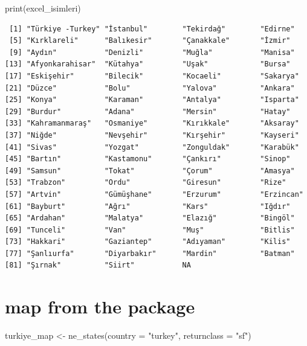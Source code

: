 \documentclass[
  11pt,
  a4paper,
  DIV=11,
  numbers=noendperiod]{scrartcl}
\newenvironment{Shaded}{\begin{snugshade}}{\end{snugshade}}
\newcommand{\AttributeTok}[1]{\textcolor[rgb]{0.40,0.45,0.13}{#1}}
\newcommand{\FunctionTok}[1]{\textcolor[rgb]{0.28,0.35,0.67}{#1}}
\newcommand{\NormalTok}[1]{\textcolor[rgb]{0.00,0.23,0.31}{#1}}
\newcommand{\OtherTok}[1]{\textcolor[rgb]{0.00,0.23,0.31}{#1}}
\newcommand{\StringTok}[1]{\textcolor[rgb]{0.13,0.47,0.30}{#1}}
\begin{document}
\begin{Shaded}
\begin{Highlighting}[]
\FunctionTok{print}\NormalTok{(excel\_isimleri)}
\end{Highlighting}
\end{Shaded}

\begin{verbatim}
 [1] "Türkiye -Turkey" "İstanbul"        "Tekirdağ"        "Edirne"         
 [5] "Kırklareli"      "Balıkesir"       "Çanakkale"       "İzmir"          
 [9] "Aydın"           "Denizli"         "Muğla"           "Manisa"         
[13] "Afyonkarahisar"  "Kütahya"         "Uşak"            "Bursa"          
[17] "Eskişehir"       "Bilecik"         "Kocaeli"         "Sakarya"        
[21] "Düzce"           "Bolu"            "Yalova"          "Ankara"         
[25] "Konya"           "Karaman"         "Antalya"         "Isparta"        
[29] "Burdur"          "Adana"           "Mersin"          "Hatay"          
[33] "Kahramanmaraş"   "Osmaniye"        "Kırıkkale"       "Aksaray"        
[37] "Niğde"           "Nevşehir"        "Kırşehir"        "Kayseri"        
[41] "Sivas"           "Yozgat"          "Zonguldak"       "Karabük"        
[45] "Bartın"          "Kastamonu"       "Çankırı"         "Sinop"          
[49] "Samsun"          "Tokat"           "Çorum"           "Amasya"         
[53] "Trabzon"         "Ordu"            "Giresun"         "Rize"           
[57] "Artvin"          "Gümüşhane"       "Erzurum"         "Erzincan"       
[61] "Bayburt"         "Ağrı"            "Kars"            "Iğdır"          
[65] "Ardahan"         "Malatya"         "Elazığ"          "Bingöl"         
[69] "Tunceli"         "Van"             "Muş"             "Bitlis"         
[73] "Hakkari"         "Gaziantep"       "Adıyaman"        "Kilis"          
[77] "Şanlıurfa"       "Diyarbakır"      "Mardin"          "Batman"         
[81] "Şırnak"          "Siirt"           NA               
\end{verbatim}

\section{map from the package}\label{map-from-the-package}

\begin{Shaded}
\begin{Highlighting}[]
\NormalTok{turkiye\_map }\OtherTok{\textless{}{-}} \FunctionTok{ne\_states}\NormalTok{(}\AttributeTok{country =} \StringTok{"turkey"}\NormalTok{, }\AttributeTok{returnclass =} \StringTok{"sf"}\NormalTok{)}
\end{Highlighting}
\end{Shaded}
\end{document}
